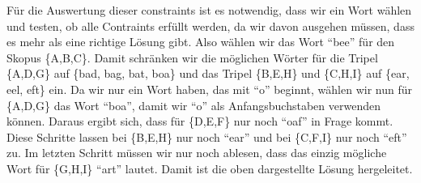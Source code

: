 \documentclass[a4paper,10pt]{article}
\begin{document}
Für die Auswertung dieser constraints ist es notwendig, dass wir ein Wort wählen und testen, ob alle Contraints erfüllt werden, da 
wir davon ausgehen müssen, dass es mehr als eine richtige Lösung gibt.
Also wählen wir das Wort ``bee'' für den Skopus \{A,B,C\}.
Damit schränken wir die möglichen Wörter für die Tripel \{A,D,G\} auf \{bad, bag, bat, boa\} und das Tripel \{B,E,H\} und \{C,H,I\} auf 
\{ear, eel, eft\} ein. Da wir nur ein Wort haben, das mit ``o'' beginnt, wählen wir nun für \{A,D,G\} das Wort ``boa'', damit wir ``o'' als Anfangsbuchstaben 
verwenden können. Daraus ergibt sich, dass für \{D,E,F\} nur noch ``oaf'' in Frage kommt. Diese Schritte lassen bei 
\{B,E,H\} nur noch ``ear'' und bei \{C,F,I\} nur noch ``eft'' zu. Im letzten Schritt müssen wir nur noch ablesen, dass das einzig mögliche Wort für
\{G,H,I\} ``art'' lautet. Damit ist die oben dargestellte Lösung hergeleitet.
\end{document}

